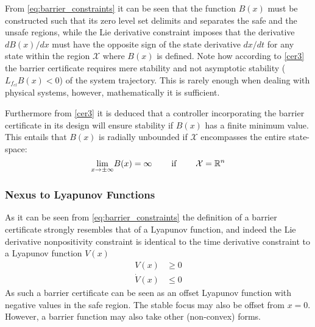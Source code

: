 From \autoref{eq:barrier_constraints} it can be seen that the function $B(x)$ must be constructed such that its zero level set delimits and separates the safe and the unsafe regions, while the Lie derivative constraint imposes that the derivative $dB(x)/dx$ must have the opposite sign of the state derivative $dx/dt$ for any state within the region $\mathcal{X}$ where $B(x)$ is defined. 
Note how according to \autoref{cer3} the barrier certificate requires mere stability and not asymptotic stability ($L_{f_{cl}}B(x)<0$) of the system trajectory. This is rarely enough when dealing with physical systems, however, mathematically it is sufficient.

Furthermore from \autoref{cer3} it is deduced that a controller incorporating the barrier certificate in its design will ensure stability if $B(x)$ has a finite minimum value. This entails that $B(x) $ is radially unbounded if $\mathcal{X}$ encompasses the entire state-space:
\begin{equation}
\underset{x\rightarrow \pm\infty}{\lim} B(x)= \infty \hspace{0.8cm} \text{if} \hspace{0.8cm} \mathcal{X}=\mathbb{R}^n
\end{equation}

\subsubsection{Nexus to Lyapunov Functions}
\vspace*{-3mm}
As it can be seen from \autoref{eq:barrier_constraints} the definition of a barrier certificate strongly resembles that of a Lyapunov function, and indeed the Lie derivative nonpositivity constraint is identical to the time derivative constraint to a Lyapunov function $V(x)$
\vspace*{-2mm}
\begin{subequations}\label{eq:lyap}
\begin{align}
V(x) &\geq 0\\
\dot{V}(x) &\leq 0
\end{align}	
\end{subequations}
As such a barrier certificate can be seen as an offset Lyapunov function with negative values in the safe region. The stable focus may also be offset from $x=0$. However, a barrier function may also take other (non-convex) forms. 




